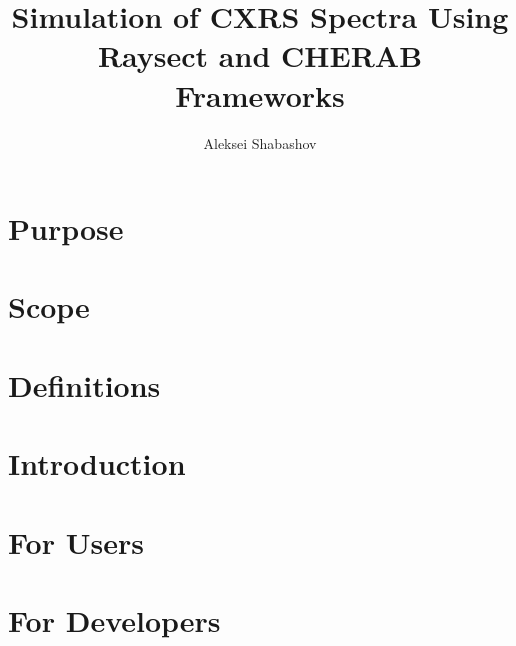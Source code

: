 \documentclass[draft,a4paper,12pt,oneside,english]{article}
\title{Simulation of CXRS Spectra Using Raysect and CHERAB Frameworks}
\author{Aleksei Shabashov}
\date{}
\begin{document}
\section{Purpose}


\section{Scope}


\section{Definitions}

\section{Introduction}


\section{For Users}



\section{For Developers}


\printbibliography%
\end{document}
